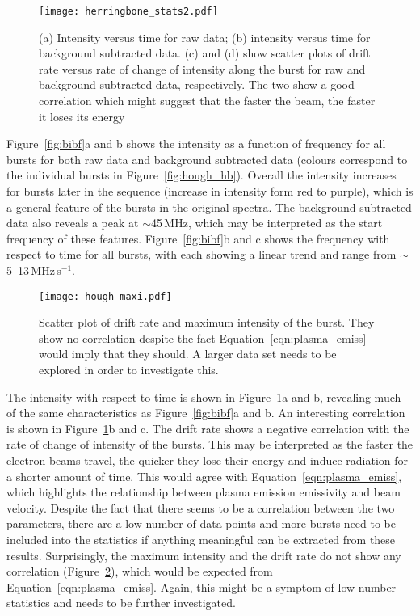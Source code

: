 %
%
\begin{figure}[t!]
\begin{center}
\texttt{[image: herringbone\_stats2.pdf]}
\caption[Herringbone statistics 2]{(a) Intensity versus time for raw data; (b) intensity versus time for background subtracted data. (c) and (d) show scatter plots of drift rate versus rate of change of intensity along the burst for raw and background subtracted data, respectively.  The two show a good correlation which might suggest that the faster the beam, the faster it loses its energy}
\label{fig:bibt}
\end{center}
\end{figure}
Figure~\ref{fig:bibf}a and b shows the intensity as a function of frequency for all bursts for both raw data and background subtracted data (colours correspond to the individual bursts in Figure~\ref{fig:hough_hb}). Overall the intensity increases for bursts later in the sequence (increase in intensity form red to purple), which is a general feature of the bursts in the original spectra. The background subtracted data also reveals a peak at $\sim$45\,MHz, which may be interpreted as the start frequency of these features.
Figure~\ref{fig:bibf}b and c shows the frequency with respect to time for all bursts, with each showing a linear trend and range from $\sim$5--13\,MHz\,s$^{-1}$.
\begin{figure}[t!]
\begin{center}
\texttt{[image: hough\_maxi.pdf]}
\caption[Herringbone intensity vs drift]{Scatter plot of drift rate and maximum intensity of the burst. They show no correlation despite the fact Equation~\ref{eqn:plasma_emiss} would imply that they should. A larger data set needs to be explored in order to investigate this.}
\label{fig:maxi}
\end{center}
\end{figure}
The intensity with respect to time is shown in Figure~\ref{fig:bibt}a and b, revealing much of the same characteristics as Figure~\ref{fig:bibf}a and b. An interesting correlation is shown in Figure~\ref{fig:bibt}b and c. The drift rate shows a negative correlation with the rate of change of intensity of the bursts. This may be interpreted as the faster the electron beams travel, the quicker they lose their energy and induce radiation for a shorter amount of time. This would agree with Equation~\ref{eqn:plasma_emiss}, which highlights the relationship between plasma emission emissivity and beam velocity.  Despite the fact that there seems to be a correlation between the two parameters, there are a low number of data points and more bursts need to be included into the statistics if anything meaningful can be extracted from these results. Surprisingly, the maximum intensity and the drift rate do not show any correlation (Figure~\ref{fig:maxi}), which would be expected from Equation~\ref{eqn:plasma_emiss}. Again, this might be a symptom of low number statistics and needs to be further investigated.
%
%

